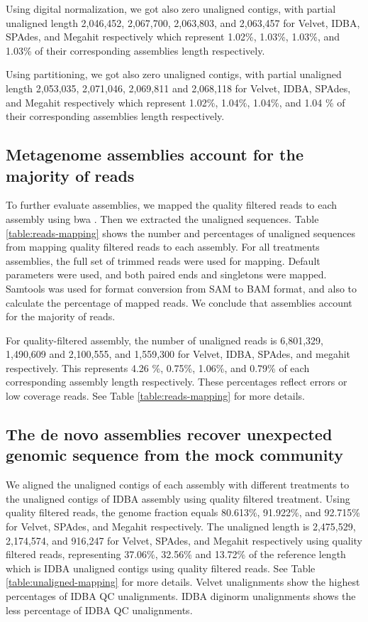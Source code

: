 Using digital normalization, we got also zero unaligned contigs, with partial unaligned length 2,046,452, 2,067,700, 2,063,803, and 2,063,457 for Velvet, IDBA, SPAdes, and Megahit respectively which represent 1.02\%, 1.03\%, 1.03\%, and 1.03\% of their corresponding assemblies length respectively.


Using partitioning, we got also zero unaligned contigs, with partial unaligned length 2,053,035, 2,071,046, 2,069,811 and 2,068,118 for Velvet, IDBA, SPAdes, and Megahit respectively which represent 1.02\%, 1.04\%, 1.04\%, and 1.04 \% of their corresponding assemblies length respectively. 

\subsection*{Metagenome assemblies account for the majority of reads}
To further evaluate assemblies, we mapped the quality filtered reads to each assembly using bwa \cite{bwa-mem}.  Then we extracted the unaligned sequences. Table \ref{table:reads-mapping} shows the number and percentages of unaligned sequences from mapping quality filtered reads to each assembly. For all treatments assemblies, the full set of trimmed reads were used for mapping. Default parameters were used, and both paired ends and singletons were mapped.  Samtools  \cite{samtools} was used for format conversion from SAM to BAM format, and also to calculate the percentage of mapped reads.  We conclude that assemblies account for the majority of reads.  


For quality-filtered assembly, the number of unaligned reads is 6,801,329, 1,490,609 and 2,100,555, and 1,559,300 for Velvet, IDBA, SPAdes, and megahit respectively. This represents 4.26 \%, 0.75\%, 1.06\%, and 0.79\% of  each corresponding assembly length respectively. These percentages reflect errors or low coverage reads. See Table \ref{table:reads-mapping} for more details. 

\subsection*{The de novo assemblies recover unexpected genomic sequence from the mock community}

We aligned the unaligned contigs of each assembly with different treatments to the unaligned contigs of IDBA assembly using quality filtered treatment. 
Using quality filtered reads, the genome fraction equals 80.613\%, 91.922\%, and 92.715\% for Velvet, SPAdes, and Megahit respectively.  The unaligned length is 2,475,529, 2,174,574, and  916,247  for Velvet, SPAdes, and Megahit respectively using quality filtered reads, representing 37.06\%, 32.56\% and 13.72\% of the reference length which is IDBA unaligned contigs using quality filtered reads. See Table \ref{table:unaligned-mapping} for more details.  Velvet unalignments show the highest percentages of IDBA QC unalignments. IDBA diginorm unalignments shows the less percentage of IDBA QC unalignments. 

